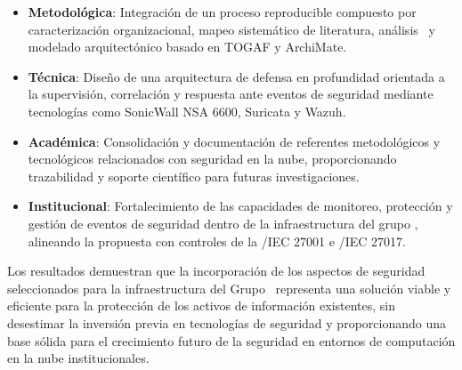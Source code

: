 \begin{itemize}
	\item \textbf{Metodológica}: Integración de un proceso reproducible compuesto por caracterización organizacional, mapeo sistemático de literatura, análisis \DAR\ y modelado arquitectónico basado en TOGAF y ArchiMate.
	
	\item \textbf{Técnica}: Diseño de una arquitectura de defensa en profundidad orientada a la supervisión, correlación y respuesta ante eventos de seguridad mediante tecnologías como SonicWall NSA 6600, Suricata y Wazuh.
	
	\item \textbf{Académica}: Consolidación y documentación de referentes metodológicos y tecnológicos relacionados con seguridad en la nube, proporcionando trazabilidad y soporte científico para futuras investigaciones.
	
	\item \textbf{Institucional}: Fortalecimiento de las capacidades de monitoreo, protección y gestión de eventos de seguridad dentro de la infraestructura del grupo \GRID, alineando la propuesta con controles de la \ISO/IEC 27001 e \ISO/IEC 27017.
\end{itemize}

Los resultados demuestran que la incorporación de los aspectos de seguridad seleccionados para la infraestructura del Grupo \GRID\ 
representa una solución viable y eficiente para la protección de los activos de información existentes, sin desestimar la inversión previa 
en tecnologías de seguridad y proporcionando una base sólida para el crecimiento futuro de la seguridad en entornos de computación en la 
nube institucionales.


